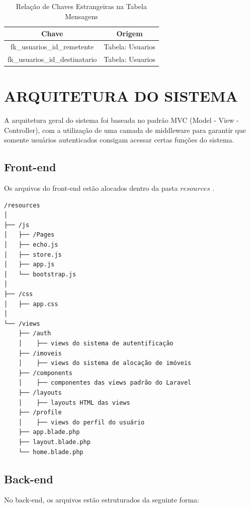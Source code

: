 \begin{table}[H]
	\centering
	\caption{Relação de Chaves Estrangeiras na Tabela Mensagens}
	\begin{tabular}{|c|c|} 
		\hline
		\textbf{Chave} & \textbf{Origem} \\
		\hline
		fk\_usuarios\_id\_remetente & Tabela: Usuarios \\
		\hline
		fk\_usuarios\_id\_destinatario & Tabela: Usuarios \\
		\hline
	\end{tabular}
	\label{tab:Mensagens}
\end{table}




\section{ARQUITETURA DO SISTEMA}

A arquitetura geral do sistema foi baseada no padrão MVC (Model - View - Controller), com a utilização de uma camada de middleware para garantir que somente usuários autenticados consigam acessar certas funções do sistema.

\subsection{Front-end}

Os arquivos do front-end estão alocados dentro da pasta \( \mathit{resources} \) .

\begin{verbatim}
/resources
│
├── /js
│   ├── /Pages
│   ├── echo.js
│   ├── store.js
│   ├── app.js              
│   └── bootstrap.js         
│
├── /css                   
│   ├── app.css            
│   
└── /views
    ├── /auth    
    │    ├── views do sistema de autentificação
    ├── /imoveis   
    │    ├── views do sistema de alocação de imóveis
    ├── /components  
    │    ├── componentes das views padrão do Laravel
    ├── /layouts   
    │    ├── layouts HTML das views
    ├── /profile   
    │    ├── views do perfil do usuário
    ├── app.blade.php
    ├── layout.blade.php    
    └── home.blade.php  
\end{verbatim}
    

\subsection{Back-end}

No back-end, os arquivos estão estruturados da seguinte forma:

